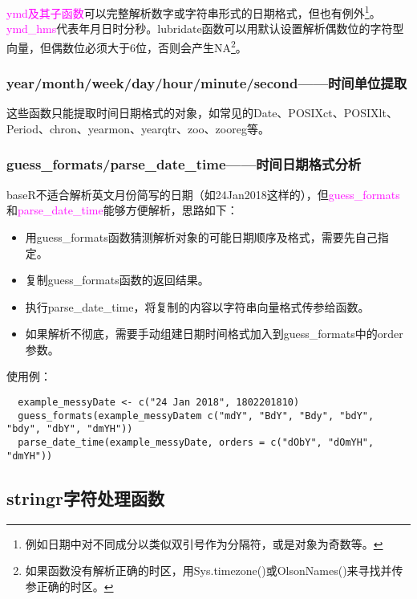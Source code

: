 \documentclass[cn,hazy,blue,14pt,screen]{elegantnote}
\begin{document}
\textcolor{magenta}{ymd及其子函数}可以完整解析数字或字符串形式的日期格式，但也有例外\footnote{例如日期中对不同成分以类似双引号作为分隔符，或是对象为奇数等。}。\textcolor{magenta}{ymd\_hms}代表年月日时分秒。lubridate函数可以用默认设置解析偶数位的字符型向量，但偶数位必须大于6位，否则会产生NA\footnote{如果函数没有解析正确的时区，用Sys.timezone()或OlsonNames()来寻找并传参正确的时区。}。

\subsubsection{year/month/week/day/hour/minute/second——时间单位提取}

这些函数只能提取时间日期格式的对象，如常见的Date、POSIXct、POSIXlt、Period、chron、yearmon、yearqtr、zoo、zooreg等。

\subsubsection{guess\_formats/parse\_date\_time——时间日期格式分析}

baseR不适合解析英文月份简写的日期（如24\quad Jan\quad 2018这样的），但\textcolor{magenta}{guess\_formats}和\textcolor{magenta}{parse\_date\_time}能够方便解析，思路如下：

\begin{itemize}
  \item 用guess\_formats函数猜测解析对象的可能日期顺序及格式，需要先自己指定。
  \item 复制guess\_formats函数的返回结果。
  \item 执行parse\_date\_time，将复制的内容以字符串向量格式传参给函数。
  \item 如果解析不彻底，需要手动组建日期时间格式加入到guess\_formats中的order参数。
\end{itemize}

使用例：

\begin{lstlisting}
  example_messyDate <- c("24 Jan 2018", 1802201810)
  guess_formats(example_messyDatem c("mdY", "BdY", "Bdy", "bdY", "bdy", "dbY", "dmYH"))
  parse_date_time(example_messyDate, orders = c("dObY", "dOmYH", "dmYH"))
\end{lstlisting}

\subsection{stringr字符处理函数}
\end{document}
